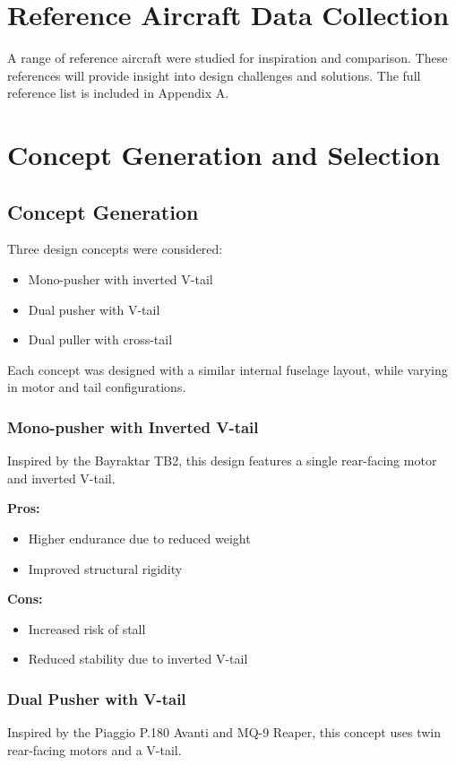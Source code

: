 \documentclass[12pt]{article}
\begin{document}
	\section{Reference Aircraft Data Collection}
	A range of reference aircraft were studied for inspiration and comparison. These references will provide insight into design challenges and solutions. The full reference list is included in Appendix A.
	
	\section{Concept Generation and Selection}
	\subsection{Concept Generation}
	Three design concepts were considered:
	
	\begin{itemize}
		\item Mono-pusher with inverted V-tail
		\item Dual pusher with V-tail
		\item Dual puller with cross-tail
	\end{itemize}
	
	Each concept was designed with a similar internal fuselage layout, while varying in motor and tail configurations.
	
	\subsubsection{Mono-pusher with Inverted V-tail}
	Inspired by the Bayraktar TB2, this design features a single rear-facing motor and inverted V-tail.
	
	\textbf{Pros:}
	\begin{itemize}
		\item Higher endurance due to reduced weight
		\item Improved structural rigidity
	\end{itemize}
	
	\textbf{Cons:}
	\begin{itemize}
		\item Increased risk of stall
		\item Reduced stability due to inverted V-tail
	\end{itemize}
	
	\subsubsection{Dual Pusher with V-tail}
	Inspired by the Piaggio P.180 Avanti and MQ-9 Reaper, this concept uses twin rear-facing motors and a V-tail.
	
\end{document}
